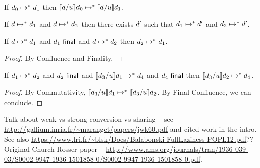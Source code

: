 \begin{theorem}[Commutativity]
  If $d_0 \mapsto^* d_1$
  then $\llbracket d / u\rrbracket d_0 \mapsto^* \llbracket d / u\rrbracket d_1$.
\end{theorem}

\begin{theorem}[Confluence]
  If $d \mapsto^* d_1$
  and $d \mapsto^* d_2$
  then there exists $d'$ such that
  $d_1 \mapsto^* d'$ and
  $d_2 \mapsto^* d'$.
\end{theorem}

\begin{corollary}
  If $d \mapsto^* d_1$
  and $d_1~\mathsf{final}$
  and $d \mapsto^* d_2$
  then $d_2 \mapsto^* d_1$.
  \begin{proof}
    By Confluence and Finality.
  \end{proof}
\end{corollary}

\begin{theorem}[Resumption]
  If $d_1 \mapsto^* d_2$
  and $d_2~\mathsf{final}$
  and $\llbracket d_3 / u\rrbracket d_1 \mapsto^* d_4$
  and $d_4~\mathsf{final}$
  then $\llbracket d_3 / u\rrbracket d_2 \mapsto^* d_4$.
  \begin{proof}
    By Commutativity,
    $\llbracket d_3 / u\rrbracket d_1 \mapsto^* \llbracket d_3 / u\rrbracket d_2$.
    By Final Confluence, we can conclude.
  \end{proof}
\end{theorem}

Talk about weak vs strong conversion vs sharing -- see \url{http://gallium.inria.fr/~maranget/papers/jwk60.pdf} and cited work in the intro. See also \url{https://www.lri.fr/~blsk/Docs/Balabonski-FullLaziness-POPL12.pdf}?? Original Church-Rosser paper -- \url{http://www.ams.org/journals/tran/1936-039-03/S0002-9947-1936-1501858-0/S0002-9947-1936-1501858-0.pdf}.



